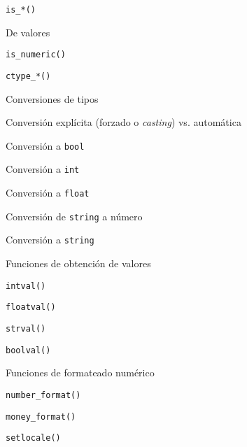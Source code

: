 \begin{longenum}
\begin{longenum}
\begin{longenum}
\begin{longenum}
\begin{longenum}
                    \item \texttt{is\_*()}
                \end{longenum}
                \item De valores
                \begin{longenum}
                    \item \texttt{is\_numeric()}
                    \item \texttt{ctype\_*()}
                \end{longenum}
            \end{longenum}
            \item Conversiones de tipos
            \begin{longenum}
                \item Conversión explícita (forzado o \textit{casting}) vs. automática
                \item Conversión a \texttt{bool}
                \item Conversión a \texttt{int}
                \item Conversión a \texttt{float}
                \item Conversión de \texttt{string} a número
                \item Conversión a \texttt{string}
                \item Funciones de obtención de valores
                \begin{longenum}
                    \item \texttt{intval()}
                    \item \texttt{floatval()}
                    \item \texttt{strval()}
                    \item \texttt{boolval()}
                \end{longenum}
                \item Funciones de formateado numérico
                \begin{longenum}
                    \item \texttt{number\_format()}
                    \item \texttt{money\_format()}
                    \begin{longenum}
                        \item \texttt{setlocale()}
                    \end{longenum}
                \end{longenum}
            \end{longenum}

\end{longenum}
\end{longenum}
\end{longenum}
